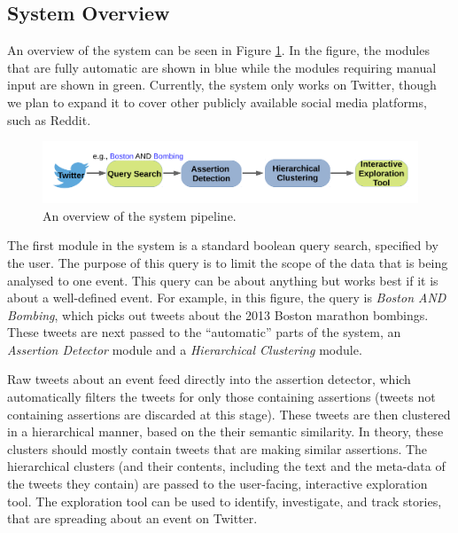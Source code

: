 \documentclass[letterpaper]{article}
\begin{document}
\subsection{System Overview}
An overview of the system can be seen in Figure \ref{fig:pipeline}. In the figure, the modules that are fully automatic are shown in blue while the modules requiring manual input are shown in green. Currently, the system only works on Twitter, though we plan to expand it to cover other publicly available social media platforms, such as Reddit.

\begin{figure}[h]
\centering
\includegraphics[width=1.\columnwidth]{pipeline1_2.pdf}
\caption{An overview of the system pipeline.}
\label{fig:pipeline}
\end{figure}


The first module in the system is a standard boolean query search, specified by the user. The purpose of this query is to limit the scope of the data that is being analysed to one event. This query can be about anything but works best if it is about a well-defined event. For example, in this figure, the query is \emph{Boston AND Bombing}, which picks out tweets about the 2013 Boston marathon bombings. These tweets are next passed to the ``automatic'' parts of the system, an \emph{Assertion Detector} module and a \emph{Hierarchical Clustering} module. 

Raw tweets about an event feed directly into the assertion detector, which automatically filters the tweets for only those containing assertions (tweets not containing assertions are discarded at this stage). These tweets are then clustered in a hierarchical manner, based on the their semantic similarity. In theory, these clusters should mostly contain tweets that are making similar assertions. The hierarchical clusters (and their contents, including the text and the meta-data of the tweets they contain) are passed to the user-facing, interactive exploration tool. The exploration tool can be used to identify, investigate, and track stories, that are spreading about an event on Twitter.  

 
\end{document}
